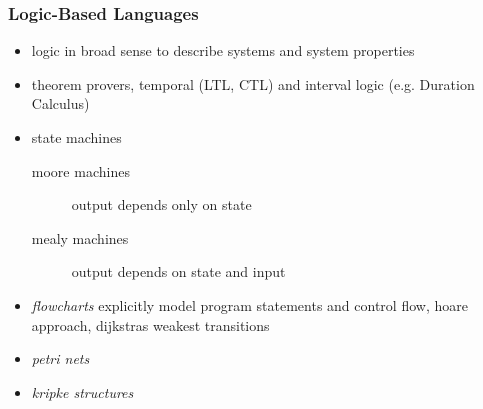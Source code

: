 \documentclass[a4paper, 10pt]{article}
\begin{document}
\subsubsection*{Logic-Based Languages}
\begin{itemize}
    \item logic in broad sense to describe systems and system properties
    \item theorem provers, temporal (LTL, CTL) and interval logic (e.g. Duration Calculus)
    \item state machines
    \begin{description}
        \item[moore machines] output depends only on state
        \item[mealy machines] output depends on state and input
    \end{description}
    \item \emph{flowcharts} explicitly model program statements and control flow, hoare approach, dijkstras weakest transitions
    \item \emph{petri nets}
    \item \emph{kripke structures}
\end{itemize}
\end{document}
